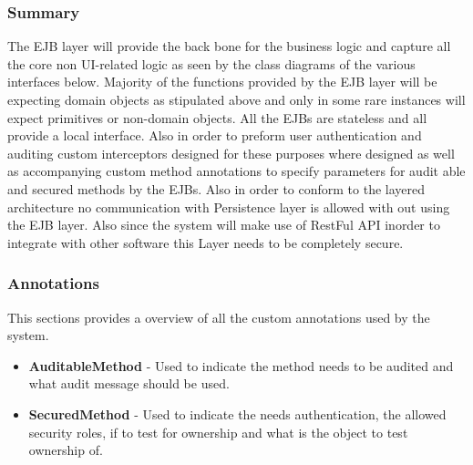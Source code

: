 \documentclass[12pt]{article}
\begin{document}
\subsubsection{Summary}
The EJB layer will provide the back bone for the business logic and capture all the core non UI-related logic as seen by the class diagrams of the various interfaces below. Majority of the functions provided by the EJB layer will be expecting domain objects as stipulated above and only in some rare instances will expect primitives or non-domain objects. All the EJBs are stateless and all provide a local interface. Also in order to preform user authentication and auditing custom interceptors designed for these purposes where designed as well as accompanying custom method annotations to specify parameters for audit able and secured methods by the EJBs. Also in order to conform to the layered architecture no communication with Persistence layer is allowed with out using the EJB layer. Also since the system will make use of RestFul API inorder to integrate with other software this Layer needs to be completely secure. 

\subsubsection{Annotations}
This sections provides a overview of all the custom annotations used by the system.
\begin{itemize}
	\item \textbf{AuditableMethod} - Used to indicate the method needs to be audited and what audit message should be used.
	\item \textbf{SecuredMethod} - Used to indicate the needs authentication, the allowed security roles, if to test for ownership and what is the object to test ownership of.
\end{itemize} 

\newpage
\end{document}
